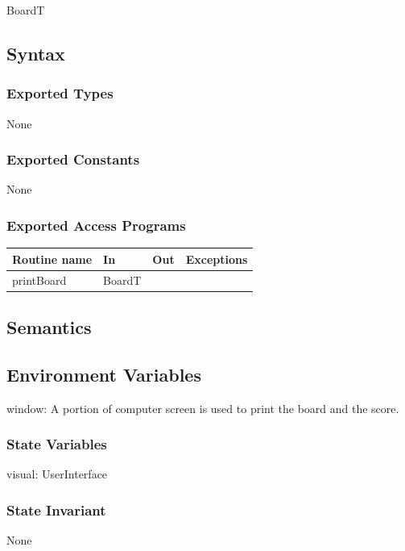 \documentclass[12pt]{article}
\begin{document}
BoardT

\subsection* {Syntax}

\subsubsection* {Exported Types}

None

\subsubsection* {Exported Constants}

None

\subsubsection* {Exported Access Programs}

\begin{tabular}{| l | l | l | p{6cm} |}
\hline
\textbf{Routine name} & \textbf{In} & \textbf{Out} & \textbf{Exceptions}\\
\hline
printBoard & BoardT & ~ & \\
\hline
\end{tabular}

\subsection* {Semantics}

\subsection*{Environment Variables}

window: A portion of computer screen is used to print the board and the score.

\subsubsection* {State Variables}

visual: UserInterface

\subsubsection* {State Invariant}

None
\end{document}
